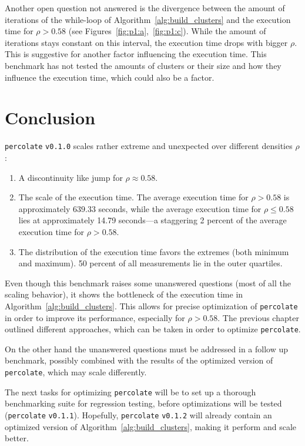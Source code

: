\documentclass[twoside,11pt]{article}
\def\perc{\texttt{perco\-late}}
\def\v{\texttt{v0.1.0}}
\begin{document}
Another open question not answered is the divergence
between the amount of iterations of the while-loop of
Algorithm~\ref{alg:build_clusters} and the execution time
for $\rho > 0.58$
(see Figures~\ref{fig:p1:a},~\ref{fig:p1:c}).
While the amount of iterations stays constant on this
interval, the execution time drops with bigger $\rho$.
This is suggestive for another factor influencing the
execution time.
This benchmark has not tested the amounts of clusters or
their size and how they influence the execution time,
which could also be a factor.


\section{Conclusion} %

\perc{} \v{} scales rather extreme and unexpected over
different densities $\rho$:

\begin{enumerate}
  \item A discontinuity like jump for $\rho \approx 0.58$.

  \item The scale of the execution time.
        The average execution time for $\rho > 0.58$ is
        approximately $639.33$ seconds, while the average
        execution time for $\rho \leq 0.58$ lies at
        approximately 14.79 seconds---a staggering 2
        percent of the average execution time for
        $\rho > 0.58$.

  \item The distribution of the execution time favors
        the extremes (both minimum and maximum). 50 percent
        of all measurements lie in the outer quartiles.
\end{enumerate}

Even though this benchmark raises some unanswered
questions (most of all the scaling behavior), it shows the
bottleneck of the execution time in
Algorithm~\ref{alg:build_clusters}.
This allows for precise optimization of \perc{} in order to
improve its performance, especially for $\rho > 0.58$.
The previous chapter outlined different approaches, which
can be taken in order to optimize \perc{}.

On the other hand the unanswered questions must be
addressed in a follow up benchmark, possibly combined with
the results of the optimized version of \perc{}, which may
scale differently.

The next tasks for optimizing \perc{} will be to set up
a thorough benchmarking suite for regression testing,
before optimizations will be tested (\perc{}
\texttt{v0.1.1}).
Hopefully, \perc{} \texttt{v0.1.2} will already contain
an optimized version of Algorithm~\ref{alg:build_clusters},
making it perform and scale better.



\end{document}
